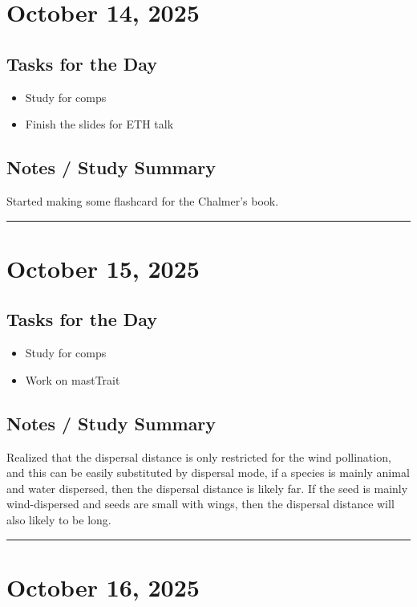 \documentclass[12pt]{article}
\begin{document}
\section*{October 14, 2025}

\subsection*{Tasks for the Day}
\begin{itemize}
    \item Study for comps
    \item Finish the slides for ETH talk
\end{itemize}
\subsection*{Notes / Study Summary}
Started making some flashcard for the Chalmer's book.
\vspace{1em}
\hrule
\vspace{1em}

\section*{October 15, 2025}

\subsection*{Tasks for the Day}
\begin{itemize}
    \item Study for comps
    \item Work on mastTrait
\end{itemize}
\subsection*{Notes / Study Summary}
Realized that the dispersal distance is only restricted for the wind pollination, and this can be easily substituted by dispersal mode, if a species is mainly animal and water dispersed, then the dispersal distance is likely far. If the seed is mainly wind-dispersed and seeds are small with wings, then the dispersal distance will also likely to be long.\\
\vspace{1em}
\hrule
\vspace{1em}

\section*{October 16, 2025}
\end{document}
